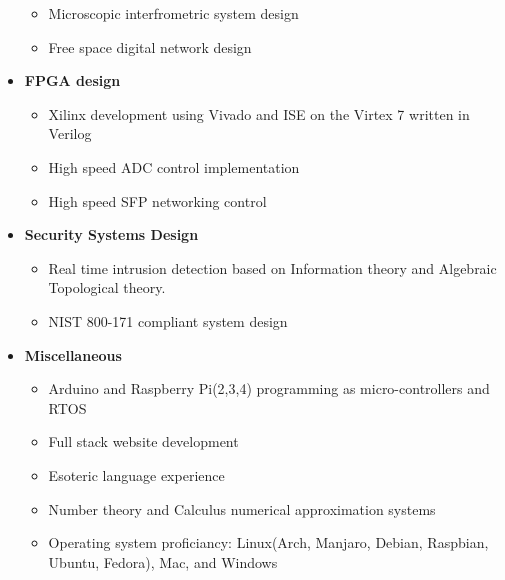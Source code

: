 \documentclass[10pt]{extarticle}
\theoremstyle{plain}
\theoremstyle{Definition}
\theoremstyle{Definition}
\theoremstyle{plain}
\begin{document}
\begin{itemize}
			\begin{itemize}
				\item Microscopic interfrometric system design
				\item Free space digital network design
			\end{itemize}
			\item \textbf{FPGA design}
			\begin{itemize}
				\item Xilinx development using Vivado and ISE on the Virtex 7 written in Verilog
				\item High speed ADC control implementation
				\item High speed SFP networking control
			\end{itemize}
			\item \textbf{Security Systems Design}
			\begin{itemize}
				\item Real time intrusion detection based on Information theory and Algebraic Topological theory. 
				\item NIST 800-171 compliant system design
			\end{itemize}
			\item \textbf{Miscellaneous}
			\begin{itemize}
				\item Arduino and Raspberry Pi(2,3,4) programming as micro-controllers and RTOS
				\item Full stack website development
				\item Esoteric language experience
				\item Number theory and Calculus numerical approximation systems
				\item Operating system proficiancy: Linux(Arch, Manjaro, Debian, Raspbian, Ubuntu, Fedora), Mac, and Windows
			\end{itemize}	
		\end{itemize}
\end{document}
